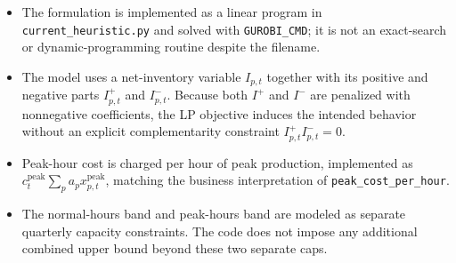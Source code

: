 \begin{itemize}
    \item The formulation is implemented as a linear program in \texttt{current\_heuristic.py} and solved with \texttt{GUROBI\_CMD}; it is not an exact-search or dynamic-programming routine despite the filename.
    \item The model uses a net-inventory variable \(I_{p,t}\) together with its positive and negative parts \(I^+_{p,t}\) and \(I^-_{p,t}\). Because both \(I^+\) and \(I^-\) are penalized with nonnegative coefficients, the LP objective induces the intended behavior without an explicit complementarity constraint \(I^+_{p,t} I^-_{p,t}=0\).
    \item Peak-hour cost is charged per hour of peak production, implemented as \(c_t^{\mathrm{peak}}\sum_p a_p x^{\mathrm{peak}}_{p,t}\), matching the business interpretation of \texttt{peak\_cost\_per\_hour}.
    \item The normal-hours band and peak-hours band are modeled as separate quarterly capacity constraints. The code does not impose any additional combined upper bound beyond these two separate caps.
\end{itemize}
